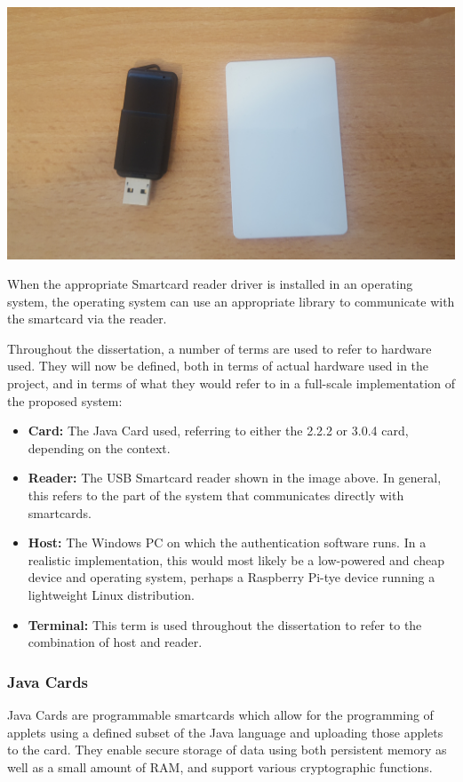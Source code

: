 \documentclass[12pt]{article}
\begin{document}
\includegraphics[scale=0.05]{introduction/hardware}

When the appropriate Smartcard reader driver is installed in an operating system, the operating system can use an appropriate library to communicate with the smartcard via the reader.


Throughout the dissertation, a number of terms are used to refer to hardware used. They will now be defined, both in terms of actual hardware used in the project, and in terms of what they would refer to in a full-scale implementation of the proposed system:

\begin{itemize}
	\item \textbf{Card:} The Java Card used, referring to either the 2.2.2 or 3.0.4 card, depending on the context.
	
	\item \textbf{Reader:} The USB Smartcard reader shown in the image above. In general, this refers to the part of the system that communicates directly with smartcards.

	\item \textbf{Host:} The Windows PC on which the authentication software runs. In a realistic implementation, this would most likely be a low-powered and cheap device and operating system, perhaps a Raspberry Pi-tye device running a lightweight Linux distribution.
	
	\item \textbf{Terminal:} This term is used throughout the dissertation to refer to the combination of host and reader.
	
\end{itemize} 

\subsubsection{Java Cards}
Java Cards are programmable smartcards which allow for the programming of applets using a defined subset of the Java language and uploading those applets to the card. They enable secure storage of data using both persistent memory as well as a small amount of RAM, and support various cryptographic functions. 
\end{document}

